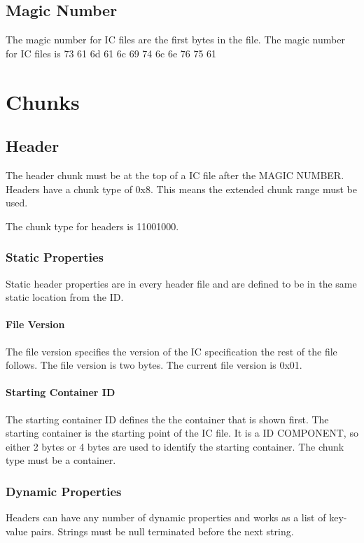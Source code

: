 \documentclass{report}
\begin{document}
\section{Magic Number}
The magic number for IC files are the first bytes in the file.
The magic number for IC files is 73 61 6d 61 6c 69 74 6c 6e 76 75 61


\chapter{Chunks}

\section{Header}
The header chunk must be at the top of a IC file after the MAGIC NUMBER. 
Headers have a chunk type of 0x8.
This means the extended chunk range must be used.

The chunk type for headers is 11001000. 

\subsection{Static Properties}
Static header properties are in every header file and are defined to be in the same static location from the ID. 

\subsubsection{File Version}
The file version specifies the version of the IC specification the rest of the file follows. The file version is two bytes.
The current file version is 0x01.

\subsubsection{Starting Container ID}
The starting container ID defines the the container that is shown first. The starting container is the starting point of the IC file. It is a ID COMPONENT, so either 2 bytes or 4 bytes are used to identify the starting container. The chunk type must be a container.

\subsection{Dynamic Properties}
Headers can have any number of dynamic properties and works as a list of key-value pairs. Strings must be null terminated before the next string.
\end{document}
